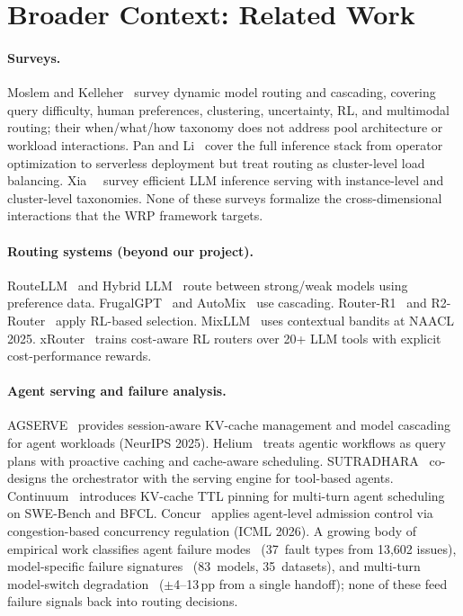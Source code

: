 \section{Broader Context: Related Work}
\label{sec:related}

\paragraph{Surveys.}
Moslem and Kelleher~\cite{moslem2026routingsurvey} survey dynamic
model routing and cascading, covering query difficulty, human
preferences, clustering, uncertainty, RL, and multimodal routing;
their when/what/how taxonomy does not address pool architecture or
workload interactions.  Pan and Li~\cite{pan2025survey} cover the
full inference stack from operator optimization to serverless
deployment but treat routing as cluster-level load balancing.
Xia~\etal~\cite{xia2025taming} survey efficient LLM inference
serving with instance-level and cluster-level taxonomies.
None of these surveys formalize the cross-dimensional interactions
that the WRP framework targets.

\paragraph{Routing systems (beyond our project).}
RouteLLM~\cite{ong2025routellm} and Hybrid LLM~\cite{ding2024hybrid}
route between strong/weak models using preference data.
FrugalGPT~\cite{chen2023frugalgpt} and
AutoMix~\cite{madaan2024automix} use cascading.
Router-R1~\cite{routerr1_2025} and
R2-Router~\cite{r2router2026} apply RL-based selection.
MixLLM~\cite{lu2025mixllm} uses contextual bandits at NAACL 2025.
xRouter~\cite{xrouter2025} trains cost-aware RL routers over
20+ LLM tools with explicit cost-performance rewards.

\paragraph{Agent serving and failure analysis.}
AGSERVE~\cite{agserve2025} provides session-aware KV-cache
management and model cascading for agent workloads (NeurIPS 2025).
Helium~\cite{helium2026} treats agentic workflows as query plans
with proactive caching and cache-aware scheduling.
SUTRADHARA~\cite{sutradhara2026} co-designs the orchestrator with
the serving engine for tool-based agents.
Continuum~\cite{continuum2025} introduces KV-cache TTL pinning
for multi-turn agent scheduling on SWE-Bench and BFCL.
Concur~\cite{concur2026} applies agent-level admission control via
congestion-based concurrency regulation (ICML 2026).
A growing body of empirical work classifies agent failure
modes~\cite{agenticfaults2026} (37~fault types from 13,602
issues), model-specific failure signatures~\cite{erroratlas2026}
(83~models, 35~datasets), and multi-turn model-switch
degradation~\cite{handoffdrift2026} ($\pm$4--13\,pp from a
single handoff); none of these feed failure signals back into
routing decisions.

